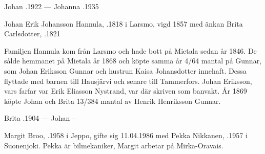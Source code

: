 Johan .1922  ---  Johanna .1935


%
Johan Erik Johansson Hannula, .1818 i Larsmo, vigd 1857 med änkan Brita Carlsdotter, .1821
\begin{jhchildren}
  \item {}
  \item {}
  \item {}
  \item {}
  \item {}
\end{jhchildren}

Familjen Hannula kom från Larsmo och hade bott på Mietala sedan år 1846. De sålde hemmanet på Mietala år 1868 och köpte samma år 4/64 mantal på Gunnar, som Johan Eriksson Gunnar och hustrun Kaisa Johansdotter innehaft. Dessa flyttade med barnen till Hausjärvi och senare till Tammerfors. Johan Eriksson, vars farfar var Erik Eliasson Nystrand, var där skriven som banvakt. År 1869 köpte Johan och Brita 13/384 mantal av Henrik Henriksson Gunnar.

Brita .1904  ---  Johan --



%



%
Margit Broo, .1958 i Jeppo, gifte sig 11.04.1986 med Pekka Nikkanen, .1957 i Suonenjoki. Pekka är bilmekaniker, Margit arbetar på Mirka-Oravais.
\begin{jhchildren}
  \item {}
  \item {}
\end{jhchildren}

